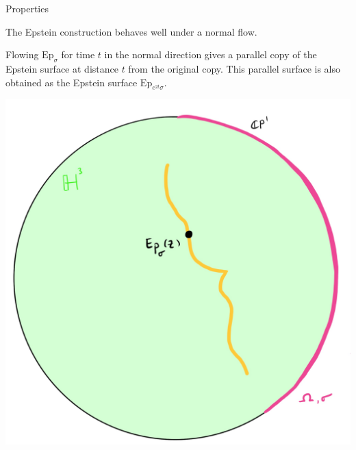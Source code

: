 \documentclass[professionalfont]{beamer}
\begin{document}
\begin{frame}{Properties}

The Epstein construction behaves well under a normal flow. 

Flowing $\mathrm{Ep}_\sigma$ for time $t$ in the normal direction gives a parallel copy of the Epstein surface at distance $t$ from the original copy. This parallel surface is also obtained as the Epstein surface $\mathrm{Ep}_{e^{2t}\sigma}$.

\centering\includegraphics[scale=0.09]{Parallel-3.jpg}

\end{frame}


\end{document}
